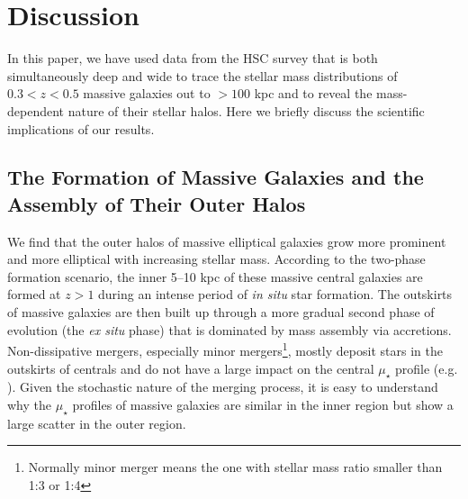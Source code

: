 \documentclass[a4paper,fleqn,usenatbib]{mnras}
\def\mden{{$\mu_{\star}$}}
\begin{document}
\section{Discussion}
    \label{sec:discussion}
    
    In this paper, we have used data from the HSC survey that is both simultaneously 
    deep and wide to trace the stellar mass distributions of $0.3 < z < 0.5$ massive 
    galaxies out to $>100$ kpc and to reveal the mass-dependent nature of their 
    stellar halos.
    Here we briefly discuss the scientific implications of our results.
    

\subsection{The Formation of Massive Galaxies and the Assembly of Their Outer Halos}
    \label{ssec:twophase}
            
    We find that the outer halos of massive elliptical galaxies grow more prominent 
    and more elliptical with increasing stellar mass.
    According to the two-phase formation scenario, the inner 5--10 kpc of these 
    massive central galaxies are formed at $z>1$ during an intense period of 
    \textit{in situ} star formation. 
    The outskirts of massive galaxies are then built up through a more gradual second 
    phase of evolution (the \textit{ex situ} phase) that is dominated by mass assembly via 
    accretions.
    Non-dissipative mergers, especially minor mergers\footnote{Normally minor merger
    means the one with stellar mass ratio smaller than 1:3 or 1:4}, mostly deposit stars
    in the outskirts of centrals and do not have a large impact on the central \mden{} 
    profile (e.g. \citealt{BoylanKolchin2008, Oogi2013, Bedorf2013}).
    Given the stochastic nature of the merging process, it is easy to understand why 
    the \mden{} profiles of massive galaxies are similar in the inner region but show
    a large scatter in the outer region. 
        
\end{document}
